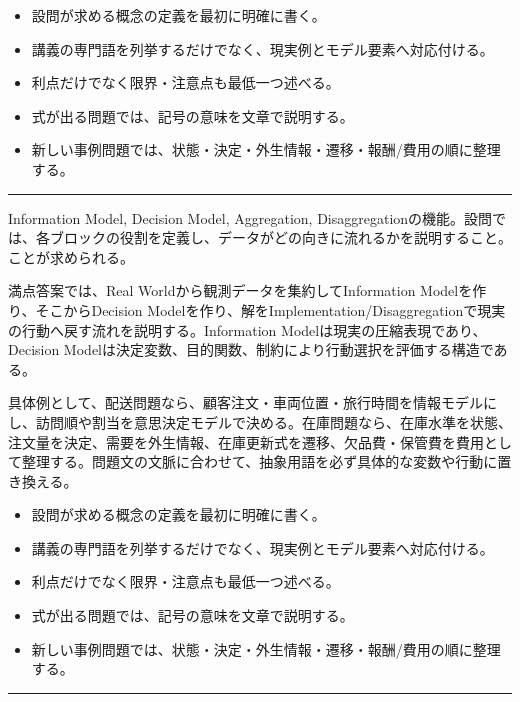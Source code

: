 \begin{itemize}
\item 設問が求める概念の定義を最初に明確に書く。
\item 講義の専門語を列挙するだけでなく、現実例とモデル要素へ対応付ける。
\item 利点だけでなく限界・注意点も最低一つ述べる。
\item 式が出る問題では、記号の意味を文章で説明する。
\item 新しい事例問題では、状態・決定・外生情報・遷移・報酬/費用の順に整理する。
\end{itemize}
\vspace{2mm}\hrule\vspace{2mm}
Information Model, Decision Model, Aggregation, Disaggregationの機能。設問では、各ブロックの役割を定義し、データがどの向きに流れるかを説明すること。 ことが求められる。\par
{}
満点答案では、Real Worldから観測データを集約してInformation Modelを作り、そこからDecision Modelを作り、解をImplementation/Disaggregationで現実の行動へ戻す流れを説明する。Information Modelは現実の圧縮表現であり、Decision Modelは決定変数、目的関数、制約により行動選択を評価する構造である。\par
{}
具体例として、配送問題なら、顧客注文・車両位置・旅行時間を情報モデルにし、訪問順や割当を意思決定モデルで決める。在庫問題なら、在庫水準を状態、注文量を決定、需要を外生情報、在庫更新式を遷移、欠品費・保管費を費用として整理する。問題文の文脈に合わせて、抽象用語を必ず具体的な変数や行動に置き換える。\par
{}
\begin{itemize}
\item 設問が求める概念の定義を最初に明確に書く。
\item 講義の専門語を列挙するだけでなく、現実例とモデル要素へ対応付ける。
\item 利点だけでなく限界・注意点も最低一つ述べる。
\item 式が出る問題では、記号の意味を文章で説明する。
\item 新しい事例問題では、状態・決定・外生情報・遷移・報酬/費用の順に整理する。
\end{itemize}
\vspace{2mm}\hrule\vspace{2mm}
